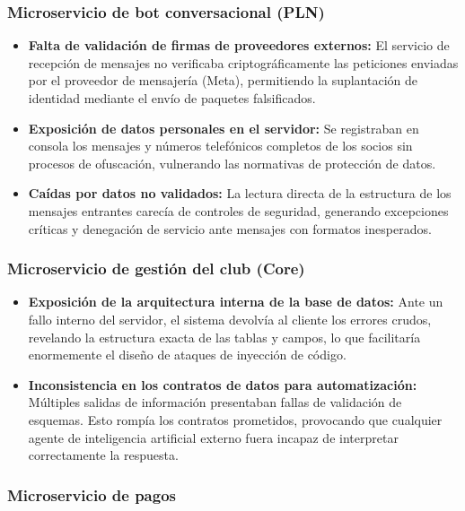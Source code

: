 \subsubsection{Microservicio de bot conversacional (PLN)}

\begin{itemize}
    \item \textbf{Falta de validación de firmas de proveedores externos:} El servicio de recepción de mensajes no verificaba criptográficamente las peticiones enviadas por el proveedor de mensajería (Meta), permitiendo la suplantación de identidad mediante el envío de paquetes falsificados.
    \item \textbf{Exposición de datos personales en el servidor:} Se registraban en consola los mensajes y números telefónicos completos de los socios sin procesos de ofuscación, vulnerando las normativas de protección de datos.
    \item \textbf{Caídas por datos no validados:} La lectura directa de la estructura de los mensajes entrantes carecía de controles de seguridad, generando excepciones críticas y denegación de servicio ante mensajes con formatos inesperados.
\end{itemize}

\subsubsection{Microservicio de gestión del club (Core)}

\begin{itemize}
    \item \textbf{Exposición de la arquitectura interna de la base de datos:} Ante un fallo interno del servidor, el sistema devolvía al cliente los errores crudos, revelando la estructura exacta de las tablas y campos, lo que facilitaría enormemente el diseño de ataques de inyección de código.
    \item \textbf{Inconsistencia en los contratos de datos para automatización:} Múltiples salidas de información presentaban fallas de validación de esquemas. Esto rompía los contratos prometidos, provocando que cualquier agente de inteligencia artificial externo fuera incapaz de interpretar correctamente la respuesta.
\end{itemize}

\newpage

\subsubsection{Microservicio de pagos}

